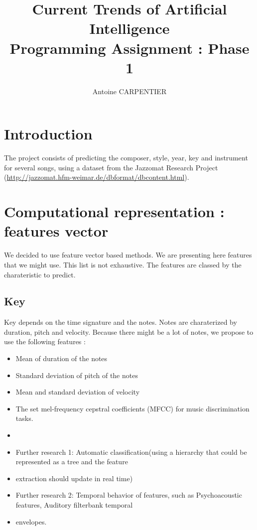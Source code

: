 \documentclass[a4paper,12pt]{article}
\author{Antoine CARPENTIER}
\title{Current Trends of Artificial Intelligence\\ \small Programming Assignment : Phase 1}
\begin{document}
\maketitle

\section{Introduction}

The project consists of predicting the composer, style, year, key and instrument for several songs, using a dataset from the Jazzomat Research Project (\url{http://jazzomat.hfm-weimar.de/dbformat/dbcontent.html}).

\section{Computational representation : features vector}

We decided to use feature vector based methods. We are presenting here features that we might use. This list is not exhaustive. The features are classed by the charateristic to predict.

\subsection{Key}

Key depends on the time signature and the notes. Notes are charaterized by duration, pitch and velocity. Because there might be a lot of notes, we propose to use the following features :

\begin{itemize}
    \item Mean of duration of the notes
    \item Standard deviation of pitch of the notes
    \item Mean and standard deviation of velocity
    \item The set mel-frequency cepstral coefficients (MFCC) for music discrimination tasks.
    \item
    
    
    
    \item Further research 1: Automatic classification(using a hierarchy that could be represented as a tree and the feature
    \item extraction should update in real time)
    \item Further research 2: Temporal behavior of features, such as Psychoacoustic features, Auditory filterbank temporal       \item envelopes.
    
\end{itemize}
\end{document}
